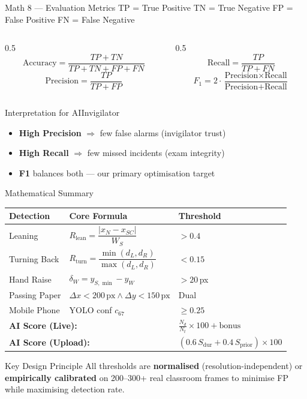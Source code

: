 \documentclass{beamer}
\begin{document}
\begin{frame}{Math 8 --- Evaluation Metrics}
TP = True Positive \quad TN = True Negative \quad FP = False Positive \quad FN = False Negative
\vspace{0.3cm}
\begin{columns}
\begin{column}{0.5\textwidth}
\[ \text{Accuracy} = \frac{TP+TN}{TP+TN+FP+FN} \]
\[ \text{Precision} = \frac{TP}{TP+FP} \]
\end{column}
\begin{column}{0.5\textwidth}
\[ \text{Recall} = \frac{TP}{TP+FN} \]
\[ F_1 = 2\cdot\frac{\text{Precision}\times\text{Recall}}{\text{Precision}+\text{Recall}} \]
\end{column}
\end{columns}
\vspace{0.4cm}
\begin{block}{Interpretation for AIInvigilator}
\begin{itemize}
    \item \textbf{High Precision} $\Rightarrow$ few false alarms (invigilator trust)
    \item \textbf{High Recall} $\Rightarrow$ few missed incidents (exam integrity)
    \item \textbf{F1} balances both --- our primary optimisation target
\end{itemize}
\end{block}
\end{frame}

\begin{frame}{Mathematical Summary}
\begin{center}
\footnotesize
\renewcommand{\arraystretch}{1.4}
\begin{tabular}{lll}
\toprule
\textbf{Detection} & \textbf{Core Formula} & \textbf{Threshold} \\
\midrule
Leaning       & $R_{\text{lean}} = \dfrac{|x_N - x_{SC}|}{W_S}$ & $> 0.4$ \\[6pt]
Turning Back  & $R_{\text{turn}} = \dfrac{\min(d_L,d_R)}{\max(d_L,d_R)}$ & $< 0.15$ \\[6pt]
Hand Raise    & $\delta_W = y_{S,\min} - y_W$ & $> 20$\,px \\[4pt]
Passing Paper & $\Delta x < 200\,\text{px} \wedge \Delta y < 150\,\text{px}$ & Dual \\[4pt]
Mobile Phone  & YOLO conf $c_{67}$ & $\geq 0.25$ \\
\midrule
\multicolumn{2}{l}{\textbf{AI Score (Live):}} & $\frac{N_d}{N_t}\times100 + \text{bonus}$ \\[4pt]
\multicolumn{2}{l}{\textbf{AI Score (Upload):}} & $(0.6\,S_{\text{dur}}+0.4\,S_{\text{prior}})\times100$ \\
\bottomrule
\end{tabular}
\end{center}
\vspace{0.3cm}
\begin{block}{Key Design Principle}
All thresholds are \textbf{normalised} (resolution-independent) or \textbf{empirically calibrated} on 200--300+ real classroom frames to minimise FP while maximising detection rate.
\end{block}
\end{frame}
\end{document}
